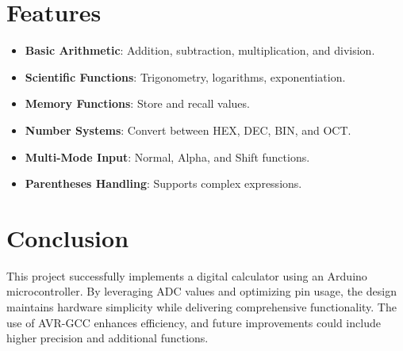 \documentclass[journal]{IEEEtran}
\begin{document}
\section{Features}
\begin{itemize}
    \item \textbf{Basic Arithmetic}: Addition, subtraction, multiplication, and division.
    \item \textbf{Scientific Functions}: Trigonometry, logarithms, exponentiation.
    \item \textbf{Memory Functions}: Store and recall values.
    \item \textbf{Number Systems}: Convert between HEX, DEC, BIN, and OCT.
    \item \textbf{Multi-Mode Input}: Normal, Alpha, and Shift functions.
    \item \textbf{Parentheses Handling}: Supports complex expressions.
\end{itemize}

\section{Conclusion}
This project successfully implements a digital calculator using an Arduino microcontroller. By leveraging ADC values and optimizing pin usage, the design maintains hardware simplicity while delivering comprehensive functionality. The use of AVR-GCC enhances efficiency, and future improvements could include higher precision and additional functions.
\end{document}
